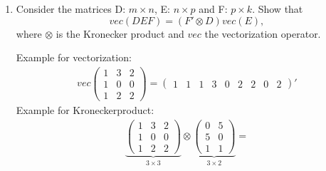 \begin{enumerate}
    \item Consider the matrices D: $m\times n$, E: $n\times p$ and F: $p\times k$. Show that $$vec(DEF)=\left(F'\otimes D\right) vec(E),$$ where $\otimes$ is the Kronecker product and $vec$ the vectorization operator.
          \begin{solution}
              Example for vectorization:
              \begin{align*}
                  vec\begin{pmatrix} 1&3&2\\1&0&0\\1&2&2 \end{pmatrix} = \begin{pmatrix} 1 &1 &1 &3 &0&2&2&0&2\end{pmatrix}'
              \end{align*}
              Example for Kroneckerproduct:
              \begin{align*}
                  \underbrace{\begin{pmatrix} 1&3&2\\1&0&0\\1&2&2 \end{pmatrix}}_{3\times3} \otimes \underbrace{\begin{pmatrix}0&5\\5&0\\1&1 \end{pmatrix}}_{3\times2} =

\end{align*}
\end{solution}
\end{enumerate}
